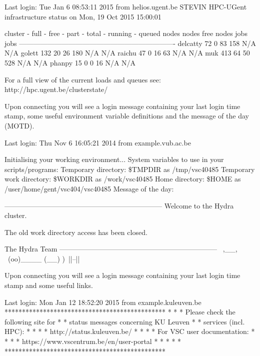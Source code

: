 \begin{prompt}
Last login: Tue Jan  6 08:53:11 2015 from helios.ugent.be
STEVIN HPC-UGent infrastructure status on Mon, 19 Oct 2015 15:00:01

   cluster - full - free -  part - total - running - queued
             nodes  nodes   free   nodes    jobs      jobs
-------------------------------------------------------------------
  delcatty     72      0     83     158      N/A       N/A
    golett    132     20     26     180      N/A       N/A
    raichu     47      0     16      63      N/A       N/A
       muk    413     64     50     528      N/A       N/A
    phanpy     15      0      0      16      N/A       N/A

For a full view of the current loads and queues see:
 http://hpc.ugent.be/clusterstate/

\end{prompt}
\fi %
%
\ifbrussel
Upon connecting you will see a login message containing your last login
time stamp, some useful environment variable definitions and the message of the
day (MOTD).

\begin{prompt}
Last login: Thu Nov  6 16:05:21 2014 from example.vub.ac.be

Initialising your working environment...
System variables to use in your scripts/programs:
  Temporary directory:   \$TMPDIR as /tmp/vsc40485
  Temporary work directory:    \$WORKDIR as /work/vsc40485
  Home directory:              \$HOME as /user/home/gent/vsc404/vsc40485
Message of the day:

  --------------------------------------------------------------------
  Welcome to the Hydra cluster.

  The old work directory access has been closed.


  The Hydra Team
  --------------------------------------------------------------------
       \   ,__,
        \  (oo)____
           (__)    )\
              ||--||

\end{prompt}
\fi %

\ifleuven
Upon connecting you will see a login message containing your last login
time stamp and some useful links.

\begin{prompt}
Last login: Mon Jan 12 18:52:20 2015 from example.kuleuven.be
**********************************************
*                                            *
* Please check the following site for        *
* status messages concerning KU Leuven       *
* services (incl. HPC):                      *
*                                            *
*   http://status.kuleuven.be/               *
*                                            *
* For VSC user documentation:                *
*                                            *
*  https://www.vscentrum.be/en/user-portal   *
*                                            *
*                                            *
**********************************************
\end{prompt}
\fi  %

